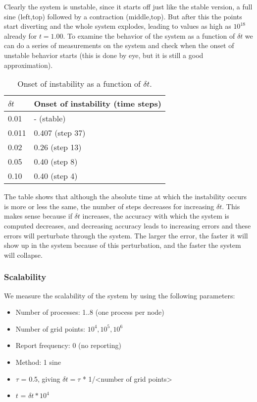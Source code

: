 \documentclass[11pt,a4paper,onecolumn]{article}
\begin{document}
Clearly the system is unstable, since it starts off just like the stable version, a full sine (left,top) followed by a contraction (middle,top). But after this the points start diverting and the whole system explodes, leading to values as high as $10^{18}$ already for $t = 1.00$. To examine the behavior of the system as a function of $\delta t$ we can do a series of measurements on the system and check when the onset of unstable behavior starts (this is done by eye, but it is still a good approximation).

\begin{table}[H]
  \centering
  \begin{tabular}{l | l}
    $\delta t$ & Onset of instability (time steps) \\
    \hline
    0.01 & - (stable) \\
    0.011 &  0.407 (step 37)\\
    0.02 & 0.26 (step 13)\\
    0.05 & 0.40 (step 8)\\
    0.10 & 0.40 (step 4)\\
  \end{tabular}
  \caption{Onset of instability as a function of $\delta t$.}
\end{table}

The table shows that although the absolute time at which the instability occurs is more or less the same, the number of steps decreases for increasing $\delta t$. This makes sense because if $\delta t$ increases, the accuracy with which the system is computed decreases, and decreasing accuracy leads to increasing errors and these errors will perturbate through the system. The larger the error, the faster it will show up in the system because of this perturbation, and the faster the system will collapse.

\subsubsection{Scalability}

We measure the scalability of the system by using the following parameters:
\begin{itemize}
\item 
  Number of processes: 1..8 (one process per node)
\item
  Number of grid points: $10^4, 10^5, 10^6$
\item
  Report frequency: 0 (no reporting)
\item
  Method: 1 sine
\item
  $\tau$ = 0.5, giving $\delta t = \tau$ * 1/<number of grid points>
\item
  $t$ = $\delta t * 10^4$
\end{itemize}
\end{document}
